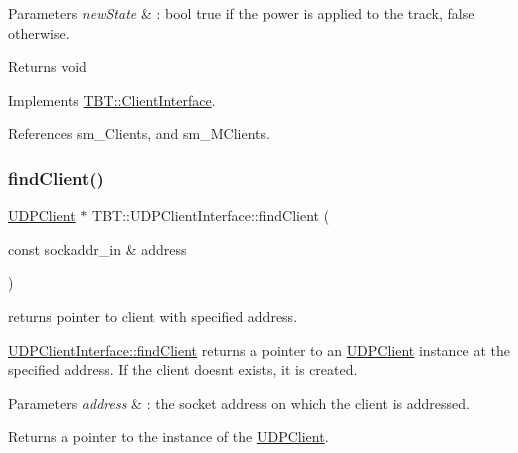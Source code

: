 \begin{DoxyParams}{Parameters}
{\em new\+State} & \+: bool true if the power is applied to the track, false otherwise.\\
\hline
\end{DoxyParams}
\begin{DoxyReturn}{Returns}
void 
\end{DoxyReturn}


Implements \hyperlink{classTBT_1_1ClientInterface_a7888a3446fb416fad75e5e008a85ca0c_a7888a3446fb416fad75e5e008a85ca0c}{T\+B\+T\+::\+Client\+Interface}.



References sm\+\_\+\+Clients, and sm\+\_\+\+M\+Clients.

\mbox{\label{classTBT_1_1UDPClientInterface_aea926878d35ed4b37143e320143a84df_aea926878d35ed4b37143e320143a84df}} 
\subsubsection{\texorpdfstring{find\+Client()}{findClient()}}
{\footnotesize\ttfamily \hyperlink{classTBT_1_1UDPClient}{U\+D\+P\+Client} $\ast$ T\+B\+T\+::\+U\+D\+P\+Client\+Interface\+::find\+Client (\begin{DoxyParamCaption}\item[{const sockaddr\+\_\+in \&}]{address }\end{DoxyParamCaption})\hspace{0.3cm}{\ttfamily [protected]}}



returns pointer to client with specified address. 

\hyperlink{classTBT_1_1UDPClientInterface_aea926878d35ed4b37143e320143a84df_aea926878d35ed4b37143e320143a84df}{U\+D\+P\+Client\+Interface\+::find\+Client} returns a pointer to an \hyperlink{classTBT_1_1UDPClient}{U\+D\+P\+Client} instance at the specified address. If the client doesn\textquotesingle{}t exists, it is created.


\begin{DoxyParams}{Parameters}
{\em address} & \+: the socket address on which the client is addressed.\\
\hline
\end{DoxyParams}
\begin{DoxyReturn}{Returns}
a pointer to the instance of the \hyperlink{classTBT_1_1UDPClient}{U\+D\+P\+Client}. 
\end{DoxyReturn}


